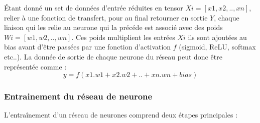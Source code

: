             \par Étant donné un set de données d’entrée réduites en tensor \( Xi = [x1, x2, .. , xn] \), relier à une fonction de transfert, pour au final retourner en sortie \( Y \), chaque liaison qui les relie au neurone qui la précéde est associé avec des poids \( Wi = [w1, w2, .. , wn] \). Ces poids multiplient les entrées \( Xi \) ils sont ajoutées au bias avant d'être passées par une fonction d’activation \( f \) (sigmoid, ReLU, softmax etc..). La donnée de sortie de chaque neurone du réseau peut donc être représentée comme :
                \[ y = f(x1.w1 + x2.w2 + .. + xn.wn + bias) \]
    
            \subsubsection{Entrainement du réseau de neurone}
            \par  L’entraînement d’un réseau de neurones comprend deux étapes principales : \cite{ch2ref12} \\
            
